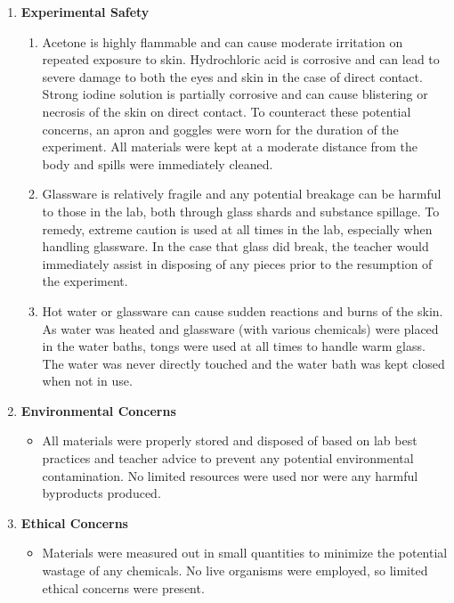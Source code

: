 \begin{enumerate}[label=(\alph*)]
	\item \textbf{Experimental Safety}
		\begin{enumerate}[label=(\roman*)]
			\item Acetone is highly flammable and can cause moderate irritation on repeated exposure to skin. Hydrochloric acid is corrosive and can lead to severe damage to both the eyes and skin in the case of direct contact. Strong iodine solution is partially corrosive and can cause blistering or necrosis of the skin on direct contact. To counteract these potential concerns, an apron and goggles were worn for the duration of the experiment. All materials were kept at a moderate distance from the body and spills were immediately cleaned.
			\item Glassware is relatively fragile and any potential breakage can be harmful to those in the lab, both through glass shards and substance spillage. To remedy, extreme caution is used at all times in the lab, especially when handling glassware. In the case that glass did break, the teacher would immediately assist in disposing of any pieces prior to the resumption of the experiment. 
			\item Hot water or glassware can cause sudden reactions and burns of the skin. As water was heated and glassware (with various chemicals) were placed in the water baths, tongs were used at all times to handle warm glass. The water was never directly touched and the water bath was kept closed when not in use.
		\end{enumerate}
	\item \textbf{Environmental Concerns}
	\begin{itemize}[label={}]
	  \item All materials were properly stored and disposed of based on lab best practices and teacher advice to prevent any potential environmental contamination. No limited resources were used nor were any harmful byproducts produced.
	\end{itemize}
	\item \textbf{Ethical Concerns}
	\begin{itemize}[label={}]
	  \item Materials were measured out in small quantities to minimize the potential wastage of any chemicals. No live organisms were employed, so limited ethical concerns were present.
	\end{itemize}
\end{enumerate}

